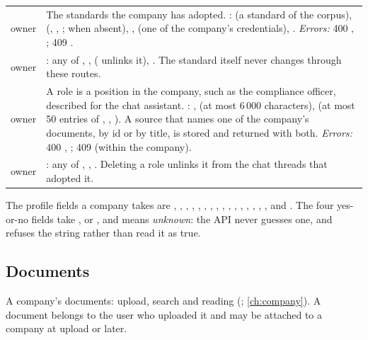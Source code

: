 \begin{xltabular}{\textwidth}{@{}L{19mm}Y@{}}
owner & The standards the company has adopted. :  (a standard of
  the corpus),  (, , ;
   when absent), ,  (one of the company's
  credentials), . \emph{Errors:} 400 , ; 409
  . \\
\addlinespace
{}
owner & : any of , ,  (
  unlinks it), . The standard itself never changes through these routes. \\
\addlinespace
{}
owner & A role is a position in the company, such as the compliance officer, described for the
  chat assistant. : ,  (at most 6\,000 characters),
   (at most 50 entries of , , ).
  A source that names one of the company's documents, by id or by title, is stored and
  returned with both.
  \emph{Errors:} 400 , ; 409 
  (within the company). \\
\addlinespace
{}
owner & : any of , , . Deleting a role
  unlinks it from the chat threads that adopted it. \\
\end{xltabular}

The profile fields a company takes are , , ,
, , , , ,
, , , ,
, , ,
,  and . The four yes-or-no fields
take ,  or , and  means \emph{unknown}: the API
never guesses one, and refuses the string  rather than read it as true.

\subsection{Documents}\label{sec:api:documents}

A company's documents: upload, search and reading (;
\cref{ch:company}). A document belongs to the user who uploaded it and may be attached to a
company at upload or later.

